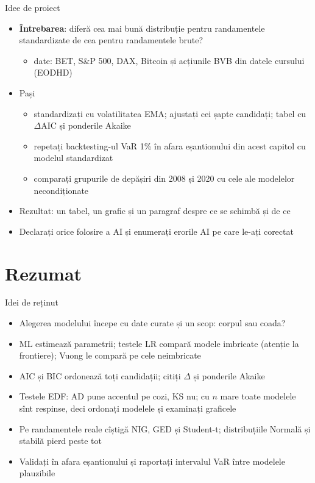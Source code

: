 \begin{frame}{Idee de proiect}
\itemsize{\small}
\begin{itemize}
    \item \textbf{Întrebarea}: diferă cea mai bună distribuție pentru randamentele standardizate de cea pentru randamentele brute?
    \begin{itemize}
        \item date: BET, S\&P 500, DAX, Bitcoin și acțiunile BVB din datele cursului (EODHD)
    \end{itemize}
    \item Pași
    \begin{itemize}
        \item standardizați cu volatilitatea EMA; ajustați cei șapte candidați; tabel cu $\Delta$AIC și ponderile Akaike
        \item repetați backtesting-ul VaR 1\% în afara eșantionului din acest capitol cu modelul standardizat
        \item comparați grupurile de depășiri din 2008 și 2020 cu cele ale modelelor necondiționate
    \end{itemize}
    \item Rezultat: un tabel, un grafic și un paragraf despre ce se schimbă și de ce
    \item Declarați orice folosire a AI și enumerați erorile AI pe care le-ați corectat
\end{itemize}
\end{frame}


\section{Rezumat}

\begin{frame}{Idei de reținut}
\itemsize{\small}
\begin{itemize}
    \item Alegerea modelului începe cu date curate și un scop: corpul sau coada?
    \item ML estimează parametrii; testele LR compară modele imbricate (atenție la frontiere); Vuong le compară pe cele neimbricate
    \item AIC și BIC ordonează toți candidații; citiți $\Delta$ și ponderile Akaike
    \item Testele EDF: AD pune accentul pe cozi, KS nu; cu $n$ mare toate modelele sînt respinse, deci ordonați modelele și examinați graficele
    \item Pe randamentele reale cîștigă NIG, GED și Student-t; distribuțiile Normală și stabilă pierd peste tot
    \item Validați în afara eșantionului și raportați intervalul VaR între modelele plauzibile
\end{itemize}
\end{frame}

